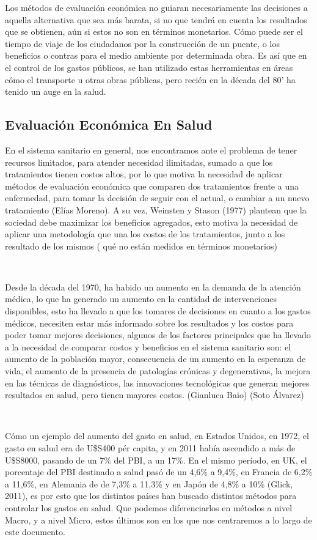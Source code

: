 \documentclass{article}
\begin{document}
Los métodos de evaluación económica no guiaran necesariamente las decisiones a aquella alternativa que sea más barata, si no que tendrá en cuenta los resultados que se obtienen, aún si estos no son en términos monetarios. Cómo puede ser el tiempo de viaje de los ciudadanos por la construcción de un puente, o los beneficios o contras para el medio ambiente por determinada obra.
Es así que en el control de los gastos públicos, se han utilizado estas herramientas en áreas cómo el transporte u otras obras públicas, pero recién en la década del 80’ ha tenido un auge en la
salud.

\subsection{Evaluación Económica En Salud}

En el sistema sanitario en general, nos encontramos ante el problema de tener recursos limitados, para atender necesidad ilimitadas, sumado a que los tratamientos tienen costos altos, por lo que motiva la necesidad de aplicar métodos de evaluación económica que comparen dos tratamientos frente a una enfermedad, para tomar la decisión de seguir con el actual, o cambiar a un nuevo tratamiento (Elías Moreno). A su vez, Weinsten y Stason (1977) plantean que la sociedad debe maximizar los beneficios agregados, esto motiva la necesidad de aplicar una metodología que una los costos de los tratamientos, junto a los resultado de los mismos ( qué no están medidos en términos monetarios)

\

Desde la década del 1970, ha habido un aumento en la demanda de la atención médica, lo que ha generado un aumento en la cantidad de intervenciones disponibles, esto ha llevado a que los tomares de decisiones en cuanto a los gastos médicos, necesiten estar más informado sobre los resultados y los costos para poder tomar mejores decisiones, algunos de los factores principales que ha llevado a la necesidad de comparar costos y beneficios en el sistema sanitario son: el aumento de la población mayor, consecuencia de un aumento en la esperanza de vida, el aumento de la presencia de patologías crónicas y degenerativas, la mejora en las técnicas de diagnósticos, las innovaciones tecnológicas que generan mejores resultados en salud, pero tienen mayores costos. (Gianluca Baio) (Soto Álvarez)

\

Cómo un ejemplo del aumento del gasto en salud, en Estados Unidos, en 1972, el gasto en salud era de U\$S400 pér capita, y en 2011 había ascendido a más de U\$S8000, pasando de un 7\% del PBI, a un 17\%.
En el mismo período, en UK, el porcentaje del PBI destinado a salud pasó de un 4,6\% a 9,4\%, en Francia de 6,2\% a 11,6\%, en Alemania de de 7,3\% a 11,3\% y en Japón de 4,8\% a 10\% (Glick, 2011), es por esto que los distintos países han buscado distintos métodos para controlar los gastos en salud. Que podemos diferenciarlos en métodos a nivel Macro, y a nivel Micro, estos últimos son en los que nos centraremos a lo largo de este documento.
\end{document}
